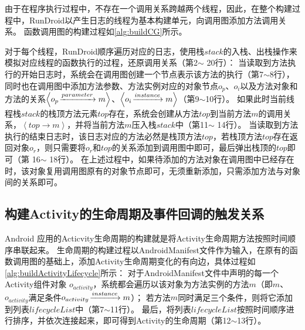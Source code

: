 由于在程序执行过程中，不存在一个调用关系跨越两个线程，因此，在整个构建过程中，RunDroid以产生日志的线程为基本构建单元，向调用图添加方法调用关系。
函数调用图的构建过程如\autoref{alg:buildCG}所示。

对于每个线程，RunDroid顺序遍历对应的日志，使用栈$stack$的入栈、出栈操作来模拟对应线程的函数执行的过程，还原调用关系（第2$\sim$ 20行）：
当读取到方法执行的开始日志时，系统会在调用图创建一个节点表示该方法的执行（第7$\sim$8行），
同时也在调用图中添加方法参数、方法实例对应的对象节点$o_p$、$o_i$以及方法对象和方法的关系$ \left\langle  o_p \joinrel\xrightarrow{parameter}   m \right\rangle   $、$ \left\langle   o_i \joinrel\xrightarrow{instance}   m \right\rangle  $（第9$\sim$10行）。
如果此时当前线程栈$stack$的栈顶方法元素$top$存在，系统会创建从方法$top$到当前方法$m$的调用关系，$\left\langle top \to m \right \rangle  $，并将当前方法$m$压入栈$stack$中（第11$\sim$ 14行）。
当读取到方法执行的结束日志时，该日志对应的方法必然是栈顶方法$top$，若栈顶方法$top$存在返回对象$o_r$，则只需要将$o_r$和$top$的关系添加到调用图中即可，最后弹出栈顶的$top$即可（第 16$\sim$ 18行）。
在上述过程中，如果待添加的方法对象在调用图中已经存在时，该对象复用调用图原有的对象节点即可，无须重新添加，只需添加方法与对象间的关系即可。








\subsection{构建Activity的生命周期及事件回调的触发关系}



Android 应用的Acticvity生命周期的构建就是将Activity生命周期方法按照时间顺序串联起来。%
生命周期的构建过程以AndroidManifest文件作为输入，在原有的函数调用图的基础上，添加Activity生命周期变化的有向边，具体过程如\autoref{alg:buildActivityLifecycle}所示：
对于AndroidManifest文件中声明的每一个Activity组件对象 $o_{activity}$，系统都会遍历以该对象为方法实例的方法$m$（即$m$、$o_{activity}$满足条件$o_{activity} \joinrel\xrightarrow{instance} m$）；
若方法$m$同时满足三个条件，则将它添加到列表$lifecycleList$中（第7$\sim$11行）。
最后，将列表$lifecycleList$按照时间顺序进行排序，并依次连接起来，即可得到{Activity}的生命周期（第12$\sim$13行）。


